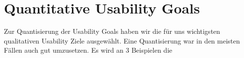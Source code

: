 \section{Quantitative Usability Goals}
Zur Quantisierung der Usability Goals haben wir die für uns wichtigsten qualitativen Usability Ziele ausgewählt. Eine Quantisierung war in den meisten Fällen auch gut umzusetzen. Es wird an 3 Beispielen die  

